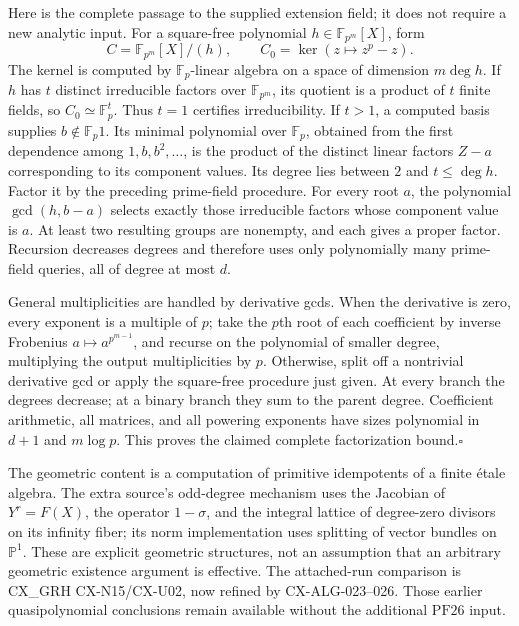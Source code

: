 Here is the complete passage to the supplied extension field; it
does not require a new analytic input. For a square-free polynomial
$h\in\mathbb F_{p^m}[X]$, form
\[
 C=\mathbb F_{p^m}[X]/(h),\qquad
 C_0=\ker(z\mapsto z^p-z).
\]
The kernel is computed by $\mathbb F_p$-linear algebra on a space
of dimension $m\deg h$. If $h$ has $t$ distinct irreducible
factors over $\mathbb F_{p^m}$, its quotient is a product of
$t$ finite fields, so $C_0\simeq\mathbb F_p^t$. Thus $t=1$
certifies irreducibility. If $t>1$, a computed basis supplies
$b\notin\mathbb F_p1$. Its minimal polynomial over
$\mathbb F_p$, obtained from the first dependence among
$1,b,b^2,\ldots$, is the product of the distinct linear factors
$Z-a$ corresponding to its component values. Its degree lies
between $2$ and $t\le\deg h$. Factor it by the preceding
prime-field procedure. For every root $a$, the polynomial
$\gcd(h,b-a)$ selects exactly those irreducible factors whose
component value is $a$. At least two resulting groups are nonempty,
and each gives a proper factor. Recursion decreases degrees and
therefore uses only polynomially many prime-field queries, all of
degree at most $d$.

General multiplicities are handled by derivative gcds. When the
derivative is zero, every exponent is a multiple of $p$; take the
$p$th root of each coefficient by inverse Frobenius
$a\mapsto a^{p^{m-1}}$, and recurse on the polynomial of smaller
degree, multiplying the output multiplicities by $p$. Otherwise,
split off a nontrivial derivative gcd or apply the square-free
procedure just given. At every branch the degrees decrease; at a
binary branch they sum to the parent degree. Coefficient arithmetic,
all matrices, and all powering exponents have sizes polynomial in
$d+1$ and $m\log p$. This proves the claimed complete
factorization bound.\hfill$\square$

The geometric content is a computation of primitive idempotents of a
finite \mbox{\'etale} algebra. The extra source's odd-degree mechanism
uses the Jacobian of $Y^r=F(X)$, the operator $1-\sigma$, and the
integral lattice of degree-zero divisors on its infinity fiber; its
norm implementation uses splitting of vector bundles on
$\mathbb P^1$. These are explicit geometric structures, not an
assumption that an arbitrary geometric existence argument is effective.
The attached-run comparison is CX\_GRH CX-N15/CX-U02, now refined by
CX-ALG-023--026. Those earlier quasipolynomial conclusions remain
available without the additional $\mathrm{PF26}$ input.

